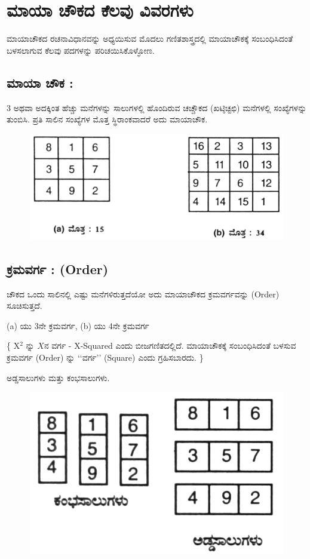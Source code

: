 \chapter{ಮಾಯಾ ಚೌಕದ ಕೆಲವು ವಿವರಗಳು}

ಮಾಯಾಚೌಕದ ರಚನಾವಿಧಾನವನ್ನು ಅಧ್ಯಯಿಸುವ ಮೊದಲು ಗಣಿತಶಾಸ್ತ್ರದಲ್ಲಿ ಮಾಯಾಚೌಕಕ್ಕೆ ಸಂಬಂಧಿಸಿದಂತೆ ಬಳಸಲಾಗುವ ಕೆಲವು ಪದಗಳನ್ನು ಪರಿಚಯಿಸಿಕೊಳ್ಳೋಣ.

\section{ಮಾಯಾ ಚೌಕ :}

3 ಅಥವಾ ಅದಕ್ಕಿಂತ ಹೆಚ್ಚು ಮನೆಗಳನ್ನು ಸಾಲುಗಳಲ್ಲಿ ಹೊಂದಿರುವ ಚಚ್ಚೌಕದ (ಖಟ್ಠಿಚ್ಟಛಿ) ಮನೆಗಳಲ್ಲಿ ಸಂಖ್ಯೆಗಳನ್ನು ತುಂಬಿಸಿ. ಪ್ರತಿ ಸಾಲಿನ ಸಂಖ್ಯೆಗಳ ಮೊತ್ತ ಸ್ಥಿರಾಂಕವಾದರೆ ಅದು ಮಾಯಾಚೌಕ.
\begin{figure}[H]
\includegraphics{src/figures/chap2/fig2.1.jpg}
\end{figure}

\section{ಕ್ರಮವರ್ಗ : (Order)}

ಚೌಕದ ಒಂದು ಸಾಲಿನಲ್ಲಿ ಎಷ್ಟು ಮನೆಗಳಿರುತ್ತದೆಯೋ ಅದು ಮಾಯಾಚೌಕದ ಕ್ರಮವರ್ಗವನ್ನು (Order) ಸೂಚಿಸುತ್ತದೆ.

(a) ಯು 3ನೇ ಕ್ರಮವರ್ಗ, (b) ಯು 4ನೇ ಕ್ರಮವರ್ಗ

\{ X$^2$ ನ್ನು $X$ನ ವರ್ಗ - X-Squared ಎಂದು ಬೀಜಗಣಿತದಲ್ಲಿದೆ. ಮಾಯಾಚೌಕಕ್ಕೆ ಸಂಬಂಧಿಸಿದಂತೆ ಬಳಸುವ ಕ್ರಮವರ್ಗ (Order) ನ್ನು ‘‘ವರ್ಗ’’ (Square) ಎಂದು ಗ್ರಹಿಸಬಾರದು. \}

ಅಡ್ಡಸಾಲುಗಳು ಮತ್ತು ಕಂಭಸಾಲುಗಳು.
\begin{figure}[H]
\includegraphics{src/figures/chap2/fig2.2.jpg}
\end{figure}

